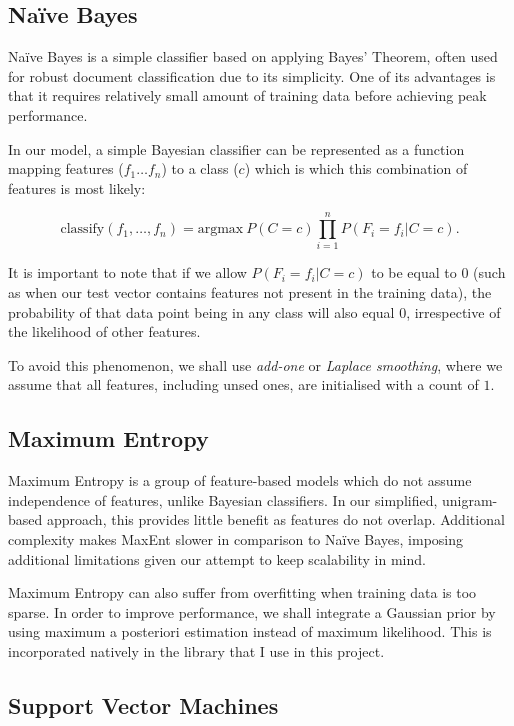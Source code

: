 \subsection{Na\"ive Bayes}

Na\"ive Bayes is a simple classifier based on applying Bayes' Theorem, often used for robust document classification due to its simplicity. One of its advantages is that it requires relatively small amount of training data before achieving peak performance.

In our model, a simple Bayesian classifier can be represented as a function mapping features ($f_1{\ldots}f_n$) to a class ($c$) which is which this combination of features is most likely:

$$\mathrm{classify}(f_1,\dots,f_n) = {\mathrm{argmax}} \ P(C=c) \prod_{i=1}^n P(F_i=f_i\vert C=c).$$

It is important to note that if we allow $P(F_i=f_i\vert C=c)$ to be equal to $0$ (such as when our test vector contains features not present in the training data), the probability of that data point being in any class will also equal $0$, irrespective of the likelihood of other features.

To avoid this phenomenon, we shall use \emph{add-one} or \emph{Laplace smoothing}, where we assume that all features, including unsed ones, are initialised with a count of $1$.

\subsection{Maximum Entropy}

Maximum Entropy is a group of feature-based models which do not assume independence of features, unlike Bayesian classifiers. In our simplified, unigram-based approach, this provides little benefit as features do not overlap. Additional complexity makes MaxEnt slower in comparison to Na\"ive Bayes, imposing additional limitations given our attempt to keep scalability in mind.

Maximum Entropy can also suffer from overfitting when training data is too sparse. In order to improve performance, we shall integrate a Gaussian prior by using maximum a posteriori estimation instead of maximum likelihood. This is incorporated natively in the library that I use in this project.

\subsection{Support Vector Machines}

